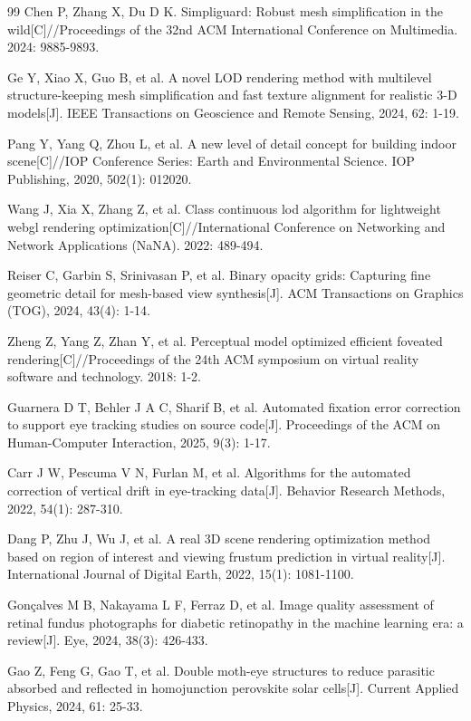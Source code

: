 \begin{thebibliography}{99}
Chen P, Zhang X, Du D K. Simpliguard: Robust mesh simplification in the wild[C]//Proceedings of the 32nd ACM International Conference on Multimedia. 2024: 9885-9893.


Ge Y, Xiao X, Guo B, et al. A novel LOD rendering method with multilevel structure-keeping mesh simplification and fast texture alignment for realistic 3-D models[J]. IEEE Transactions on Geoscience and Remote Sensing, 2024, 62: 1-19.

Pang Y, Yang Q, Zhou L, et al. A new level of detail concept for building indoor scene[C]//IOP Conference Series: Earth and Environmental Science. IOP Publishing, 2020, 502(1): 012020.

Wang J, Xia X, Zhang Z, et al. Class continuous lod algorithm for lightweight webgl rendering optimization[C]//International Conference on Networking and Network Applications (NaNA). 2022: 489-494.

Reiser C, Garbin S, Srinivasan P, et al. Binary opacity grids: Capturing fine geometric detail for mesh-based view synthesis[J]. ACM Transactions on Graphics (TOG), 2024, 43(4): 1-14.

Zheng Z, Yang Z, Zhan Y, et al. Perceptual model optimized efficient foveated rendering[C]//Proceedings of the 24th ACM symposium on virtual reality software and technology. 2018: 1-2.

Guarnera D T, Behler J A C, Sharif B, et al. Automated fixation error correction to support eye tracking studies on source code[J]. Proceedings of the ACM on Human-Computer Interaction, 2025, 9(3): 1-17.

Carr J W, Pescuma V N, Furlan M, et al. Algorithms for the automated correction of vertical drift in eye-tracking data[J]. Behavior Research Methods, 2022, 54(1): 287-310.

Dang P, Zhu J, Wu J, et al. A real 3D scene rendering optimization method based on region of interest and viewing frustum prediction in virtual reality[J]. International Journal of Digital Earth, 2022, 15(1): 1081-1100.


Gonçalves M B, Nakayama L F, Ferraz D, et al. Image quality assessment of retinal fundus photographs for diabetic retinopathy in the machine learning era: a review[J]. Eye, 2024, 38(3): 426-433.

Gao Z, Feng G, Gao T, et al. Double moth-eye structures to reduce parasitic absorbed and reflected in homojunction perovskite solar cells[J]. Current Applied Physics, 2024, 61: 25-33.



\end{thebibliography}
